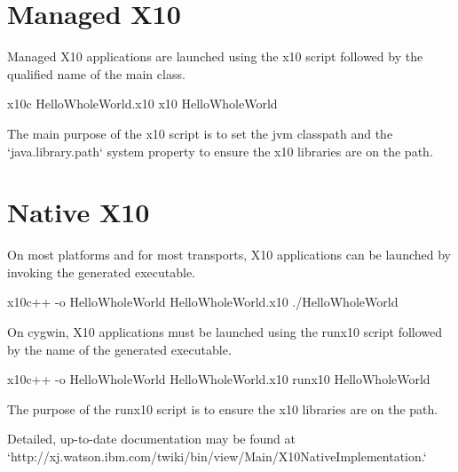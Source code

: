 \section{Managed X10}
\label{sect:RunningManaged}


Managed X10 applications are launched using the x10 script followed by the qualified name of the main class.

\begin{xten}
x10c HelloWholeWorld.x10
x10 HelloWholeWorld
\end{xten}

The main purpose of the x10 script is to set the jvm classpath and the
\xcd`java.library.path` system property to ensure the x10 libraries are on the
path.  


\section{Native X10}
\label{sect:RunningNative}

On most platforms and for most transports, X10 applications can be launched by invoking the generated executable.

\begin{xten}
x10c++ -o HelloWholeWorld HelloWholeWorld.x10
./HelloWholeWorld
\end{xten}

On cygwin, X10 applications must be launched using the runx10 script followed by the name of the generated executable.

\begin{xten}
x10c++ -o HelloWholeWorld HelloWholeWorld.x10
runx10 HelloWholeWorld
\end{xten}
The purpose of the runx10 script is to ensure the x10 libraries are on the path. 



Detailed, up-to-date documentation may be found at
\xcd`http://xj.watson.ibm.com/twiki/bin/view/Main/X10NativeImplementation.`

